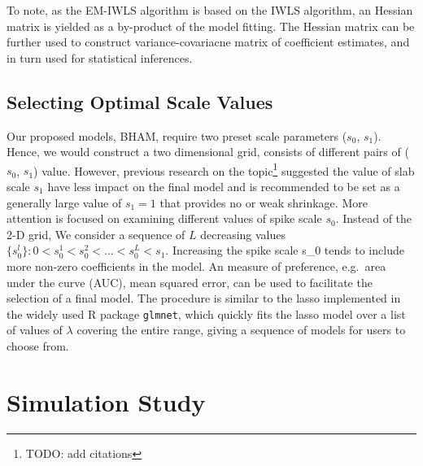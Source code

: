 \documentclass[AMA,STIX1COL,]{WileyNJD-v2}
\begin{document}
To note, as the EM-IWLS algorithm is based on the IWLS algorithm, an
Hessian matrix is yielded as a by-product of the model fitting. The
Hessian matrix can be further used to construct variance-covariacne
matrix of coefficient estimates, and in turn used for statistical
inferences.

\hypertarget{selecting-optimal-scale-values}{%
\subsection{Selecting Optimal Scale
Values}\label{selecting-optimal-scale-values}}

\label{sec:tune} Our proposed models, BHAM, require two preset scale
parameters (\(s_0\), \(s_1\)). Hence, we would construct a two
dimensional grid, consists of different pairs of (\(s_0\), \(s_1\))
value. However, previous research on the topic\footnote{TODO: add
  citations} suggested the value of slab scale \(s_1\) have less impact
on the final model and is recommended to be set as a generally large
value of \(s_1 = 1\) that provides no or weak shrinkage. More attention
is focused on examining different values of spike scale \(s_0\). Instead
of the 2-D grid, We consider a sequence of \(L\) decreasing values
\(\{s_0^l\}: 0 < s_0^1 < s_0^2 < \dots < s_0^L < s_1\). Increasing the
spike scale s\_0 tends to include more non-zero coefficients in the
model. An measure of preference, e.g.~area under the curve (AUC), mean
squared error, can be used to facilitate the selection of a final model.
The procedure is similar to the lasso implemented in the widely used R
package \texttt{glmnet}, which quickly fits the lasso model over a list
of values of \(\lambda\) covering the entire range, giving a sequence of
models for users to choose from.

\hypertarget{simulation-study}{%
\section{Simulation Study}\label{simulation-study}}
\end{document}
